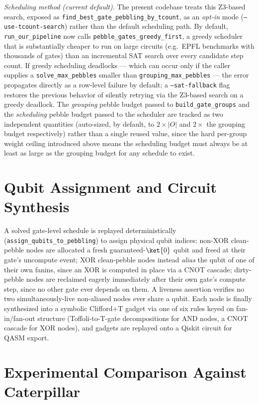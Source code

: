 \emph{Scheduling method (current default).} The present codebase
treats this Z3-based search, exposed as
\texttt{find\_best\_gate\_pebbling\_by\_tcount}, as an
\emph{opt-in} mode (\texttt{--use-tcount-search}) rather than the
default scheduling path. By default, \texttt{run\_our\_pipeline} now
calls \texttt{pebble\_gates\_greedy\_first}, a greedy scheduler that
is substantially cheaper to run on large circuits (e.g.\ EPFL
benchmarks with thousands of gates) than an incremental SAT search
over every candidate step count. If greedy scheduling deadlocks
--- which can occur only if the caller supplies a
\texttt{solve\_max\_pebbles} smaller than \texttt{grouping\_max\_pebbles}
--- the error propagates directly as a row-level failure by default;
a \texttt{--sat-fallback} flag restores the previous behavior of
silently retrying via the Z3-based search on a greedy deadlock. The
\emph{grouping} pebble budget passed to \texttt{build\_gate\_groups}
and the \emph{scheduling} pebble budget passed to the scheduler are
tracked as two independent quantities (auto-sized, by default, to
$2\times|O|$ and $2\times$ the grouping budget respectively) rather
than a single reused value, since the hard per-group weight ceiling
introduced above means the scheduling budget must always be at least
as large as the grouping budget for any schedule to exist.

\section{Qubit Assignment and Circuit Synthesis}

A solved gate-level schedule is replayed deterministically
(\texttt{assign\_qubits\_to\_pebbling}) to assign physical qubit
indices: non-XOR clean-pebble nodes are allocated a fresh
guaranteed-$\ket{0}$ qubit and freed at their gate's uncompute event;
XOR clean-pebble nodes instead \emph{alias} the qubit of one of their
own fanins, since an XOR is computed in place via a CNOT cascade;
dirty-pebble nodes are reclaimed eagerly immediately after their own
gate's compute step, since no other gate ever depends on them. A
liveness assertion verifies no two simultaneously-live non-aliased
nodes ever share a qubit. Each node is finally synthesized into a
symbolic Clifford+T gadget via one of six rules keyed on fan-in/fan-out
structure (Toffoli-to-T-gate decompositions for AND nodes, a CNOT
cascade for XOR nodes), and gadgets are replayed onto a Qiskit
circuit for QASM export.

\section{Experimental Comparison Against Caterpillar}
\label{sec-caterpillar-comparison}

